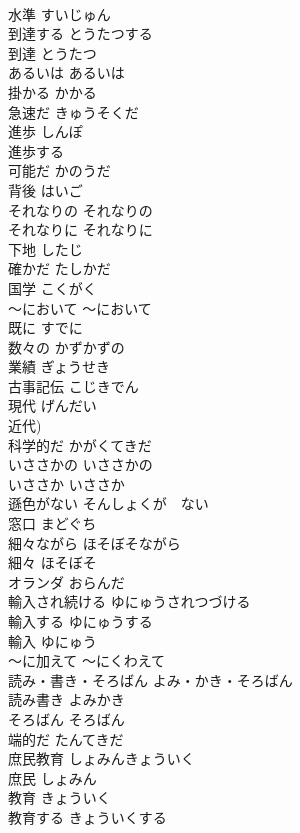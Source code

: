 \documentclass[8pt]{extreport}
\begin{document}
\begin{CJK}{UTF8}{min}
\\	水準	すいじゅん	
\\	到達する	とうたつする	
\\	到達	とうたつ	
\\	あるいは	あるいは	
\\	掛かる	かかる	
\\	急速だ	きゅうそくだ	
\\	進歩	しんぽ	
\\	進歩する	
\\	可能だ	かのうだ	
\\	背後	はいご	
\\	それなりの	それなりの	
\\	それなりに	それなりに	
\\	下地	したじ	
\\	確かだ	たしかだ	
\\	国学	こくがく	
\\	〜において	〜において	
\\	既に	すでに	
\\	数々の	かずかずの	
\\	業績	ぎょうせき	
\\	古事記伝	こじきでん	
\\	現代	げんだい	
\\	近代)
\\	科学的だ	かがくてきだ	
\\	いささかの	いささかの	
\\	いささか	いささか	
\\	遜色がない	そんしょくが　ない	
\\	窓口	まどぐち	
\\	細々ながら	ほそぼそながら	
\\	細々	ほそぼそ	
\\	オランダ	おらんだ	
\\	輸入され続ける	ゆにゅうされつづける	
\\	輸入する	ゆにゅうする	
\\	輸入	ゆにゅう	
\\	〜に加えて	〜にくわえて	
\\	読み・書き・そろばん	よみ・かき・そろばん	
\\	読み書き	よみかき	
\\	そろばん	そろばん	
\\	端的だ	たんてきだ	
\\	庶民教育	しょみんきょういく	
\\	庶民	しょみん	
\\	教育	きょういく	
\\	教育する	きょういくする	

\end{CJK}
\end{document}
